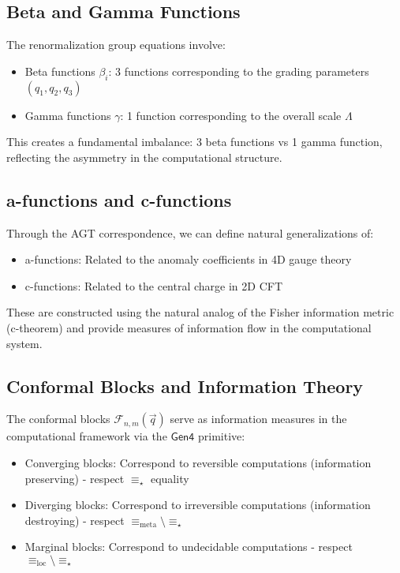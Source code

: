 \subsection{Beta and Gamma Functions}

\begin{definition}
\label{def:beta-gamma}
The renormalization group equations involve:
\begin{itemize}
\item Beta functions $\beta_i$: 3 functions corresponding to the grading parameters $(q_1, q_2, q_3)$
\item Gamma functions $\gamma$: 1 function corresponding to the overall scale $\Lambda$
\end{itemize}
This creates a fundamental imbalance: 3 beta functions vs 1 gamma function, reflecting the asymmetry in the computational structure.
\end{definition}

\subsection{a-functions and c-functions}

\begin{conjecture}
\label{conj:a-c-functions}
Through the AGT correspondence, we can define natural generalizations of:
\begin{itemize}
\item a-functions: Related to the anomaly coefficients in 4D gauge theory
\item c-functions: Related to the central charge in 2D CFT
\end{itemize}
These are constructed using the natural analog of the Fisher information metric (c-theorem) and provide measures of information flow in the computational system.
\end{conjecture}

\subsection{Conformal Blocks and Information Theory}

\begin{theorem}
\label{thm:blocks-information-g6}
The conformal blocks $\mathcal{F}_{n,m}(\vec{q})$ serve as information measures in the computational framework via the $\mathsf{Gen4}$ primitive:
\begin{itemize}
\item Converging blocks: Correspond to reversible computations (information preserving) - respect $\equiv_\star$ equality
\item Diverging blocks: Correspond to irreversible computations (information destroying) - respect $\equiv_{\text{meta}} \setminus \equiv_\star$
\item Marginal blocks: Correspond to undecidable computations - respect $\equiv_{\text{loc}} \setminus \equiv_\star$
\end{itemize}
\end{theorem}

